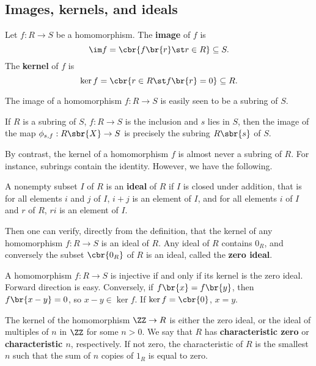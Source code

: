 \subsection{Images, kernels, and ideals}

\begin{definition}
Let $ f : R \to S $ be a homomorphism. The \textbf{image} of $ f $ is
$$ \im f = \cbr{f\br{r} \st r \in R} \subseteq S. $$
The \textbf{kernel} of $ f $ is
$$ \ker f = \cbr{r \in R \st f\br{r} = 0} \subseteq R. $$
\end{definition}

The image of a homomorphism $ f : R \to S $ is easily seen to be a subring of $ S $.

\begin{example*}
If $ R $ is a subring of $ S $, $ f : R \to S $ is the inclusion and $ s $ lies in $ S $, then the image of the map $ \phi_{s, f} : R\sbr{X} \to S $ is precisely the subring $ R\sbr{s} $ of $ S $.
\end{example*}

By contrast, the kernel of a homomorphism $ f $ is almost never a subring of $ R $. For instance, subrings contain the identity. However, we have the following.


\begin{definition}
A nonempty subset $ I $ of $ R $ is an \textbf{ideal} of $ R $ if $ I $ is closed under addition, that is for all elements $ i $ and $ j $ of $ I $, $ i + j $ is an element of $ I $, and for all elements $ i $ of $ I $ and $ r $ of $ R $, $ ri $ is an element of $ I $.
\end{definition}

Then one can verify, directly from the definition, that the kernel of any homomorphism $ f : R \to S $ is an ideal of $ R $. Any ideal of $ R $ contains $ 0_R $, and conversely the subset $ \cbr{0_R} $ of $ R $ is an ideal, called the \textbf{zero ideal}.

\begin{note*}
A homomorphism $ f : R \to S $ is injective if and only if its kernel is the zero ideal. Forward direction is easy. Conversely, if $ f\br{x} = f\br{y} $, then $ f\br{x - y} = 0 $, so $ x - y \in \ker f $. If $ \ker f = \cbr{0} $, $ x = y $.
\end{note*}

The kernel of the homomorphism $ \ZZ \to R $ is either the zero ideal, or the ideal of multiples of $ n $ in $ \ZZ $ for some $ n > 0 $. We say that $ R $ has \textbf{characteristic zero} or \textbf{characteristic $ n $}, respectively. If not zero, the characteristic of $ R $ is the smallest $ n $ such that the sum of $ n $ copies of $ 1_R $ is equal to zero.

